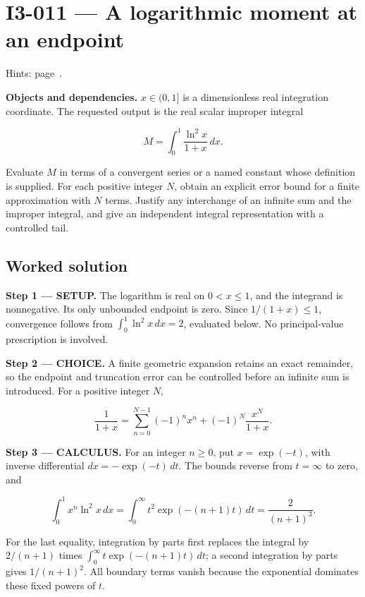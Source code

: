 \documentclass[11pt,oneside,openany]{book}
\begin{document}
\section{I3-011 --- A logarithmic moment at an endpoint}
\label{problem:I3-011}
{\small Hints: page~\pageref{hints:I3-011}.}\par\medskip

\textbf{Objects and dependencies.} \(x\in(0,1]\) is a dimensionless real integration coordinate. The requested output is the real scalar improper integral

\[
M=\int_0^1\frac{\ln^2x}{1+x}\,dx.
\]

Evaluate \(M\) in terms of a convergent series or a named constant whose definition is supplied. For each positive integer \(N\), obtain an explicit error bound for a finite approximation with \(N\) terms. Justify any interchange of an infinite sum and the improper integral, and give an independent integral representation with a controlled tail.
\subsection*{Worked solution}

\textbf{Step 1 --- SETUP.} The logarithm is real on \(0<x\le1\), and the integrand is nonnegative. Its only unbounded endpoint is zero. Since \(1/(1+x)\le1\), convergence follows from \(\int_0^1\ln^2x\,dx=2\), evaluated below. No principal-value prescription is involved.

\begin{ChoiceStep}
\textbf{Step 2 --- CHOICE.} A finite geometric expansion retains an exact remainder, so the endpoint and truncation error can be controlled before an infinite sum is introduced. For a positive integer \(N\),

\[
\frac1{1+x}=\sum_{n=0}^{N-1}(-1)^nx^n+(-1)^N\frac{x^N}{1+x}.
\]

\end{ChoiceStep}
\textbf{Step 3 --- CALCULUS.} For an integer \(n\ge0\), put \(x=\exp(-t)\), with inverse differential \(dx=-\exp(-t)\,dt\). The bounds reverse from \(t=\infty\) to zero, and

\[
\int_0^1x^n\ln^2x\,dx
=\int_0^\infty t^2\exp(-(n+1)t)\,dt
=\frac{2}{(n+1)^3}.
\]

For the last equality, integration by parts first replaces the integral by \(2/(n+1)\) times \(\int_0^\infty t\exp(-(n+1)t)\,dt\); a second integration by parts gives \(1/(n+1)^2\). All boundary terms vanish because the exponential dominates these fixed powers of \(t\).
\end{document}
